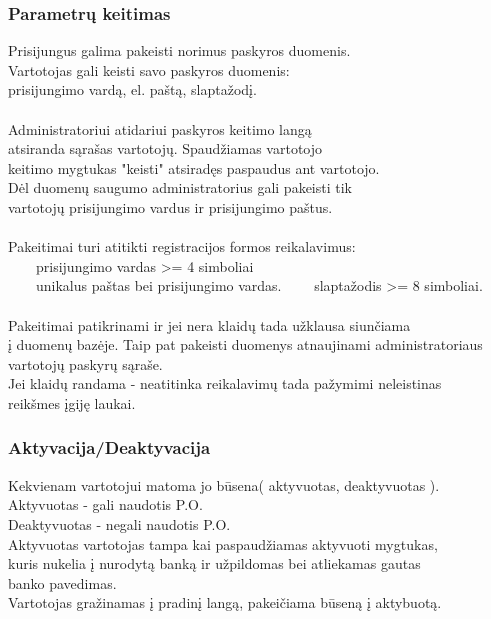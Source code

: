\documentclass[a4paper,12pt]{article}
\newcommand{\tabitem}{~~\llap{\textbullet}~~}
\begin{document}
\subsubsection{Parametrų keitimas}
Prisijungus galima pakeisti norimus paskyros duomenis.\\
Vartotojas gali keisti savo paskyros duomenis: \\
	prisijungimo vardą, el. paštą, slaptažodį. \\\\
	
Administratoriui atidariui paskyros keitimo langą\\
atsiranda sąrašas vartotojų. Spaudžiamas vartotojo \\
keitimo mygtukas "keisti" atsiradęs paspaudus ant vartotojo.\\
Dėl duomenų saugumo administratorius gali pakeisti tik\\
vartotojų prisijungimo vardus ir prisijungimo paštus. \\\\

Pakeitimai turi atitikti registracijos formos reikalavimus: \\
	\tabitem prisijungimo vardas >= 4 simboliai\\
	\tabitem unikalus paštas bei prisijungimo vardas.
    \tabitem slaptažodis >= 8 simboliai. \\\\
    
Pakeitimai patikrinami ir jei nera klaidų tada užklausa siunčiama \\
į duomenų bazėje. Taip pat pakeisti duomenys atnaujinami administratoriaus \\
vartotojų paskyrų sąraše. \\
Jei klaidų randama - neatitinka reikalavimų tada pažymimi neleistinas \\
reikšmes įgiję laukai.\\

\subsubsection{Aktyvacija/Deaktyvacija}
Kekvienam vartotojui matoma jo būsena( aktyvuotas, deaktyvuotas ).\\
Aktyvuotas - gali naudotis P.O.\\
Deaktyvuotas - negali naudotis P.O.\\

Aktyvuotas vartotojas tampa kai paspaudžiamas aktyvuoti mygtukas,\\ 
kuris nukelia į nurodytą banką ir užpildomas bei atliekamas gautas \\
banko pavedimas. \\
Vartotojas gražinamas į pradinį langą, pakeičiama būseną į aktybuotą. \\
\end{document}
